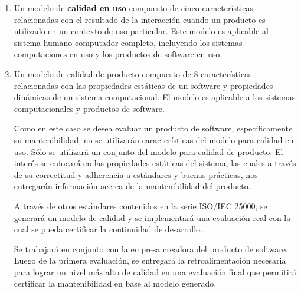 \begin{enumerate}
\item Un modelo de \textbf{calidad en uso} compuesto de cinco características
relacionadas con el resultado de la interacción cuando un producto es utilizado
en un contexto de uso particular. Este modelo es aplicable al sistema
humano-computador completo, incluyendo los sistemas computaciones en uso
y los productos de software en uso.

\item Un modelo de calidad de producto compuesto de 8 características relacionadas
con las propiedades estáticas de un software y propiedades dinámicas de un sistema
computacional. El modelo es aplicable a los sistemas computacionales y productos
de software.

Como en este caso se desea evaluar un producto de software, específicamente
su mantenibilidad, no se utilizarán características del modelo para calidad
en uso. Sólo se utilizará un conjunto del modelo para calidad de producto.
El interés se enfocará en las propiedades estáticas del sistema, las cuales
a través de su correctitud y adherencia a estándares y buenas prácticas, nos
entregarán información acerca de la mantenibilidad del producto.

A través de otros estándares contenidos en la serie ISO/IEC 25000, se generará
un modelo de calidad y se implementará una evaluación real con la cual se 
pueda certificar la continuidad de desarrollo.

Se trabajará en conjunto con la empresa creadora del producto de software.
Luego de la primera evaluación, se entregará la retroalimentación necesaria
para lograr un nivel más alto de calidad en una evaluación final que permitirá
certificar la mantenibilidad en base al modelo generado.
\end{enumerate}
